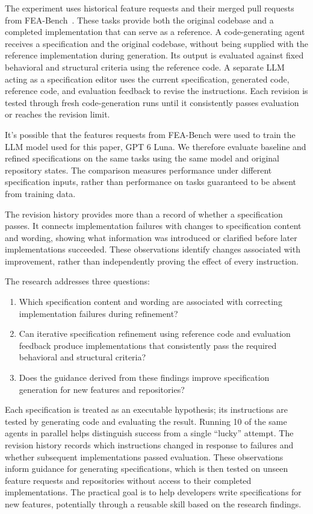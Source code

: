 \documentclass[sigconf,nonacm]{acmart}
\begin{document}
The experiment uses historical feature requests and their merged pull requests from FEA-Bench~\citep{fea2025}. These tasks provide both the original codebase and a completed implementation that can serve as a reference. A code-generating agent receives a specification and the original codebase, without being supplied with the reference implementation during generation. Its output is evaluated against fixed behavioral and structural criteria using the reference code. A separate LLM acting as a specification editor uses the current specification, generated code, reference code, and evaluation feedback to revise the instructions. Each revision is tested through fresh code-generation runs until it consistently passes evaluation or reaches the revision limit.

It's possible that the features requests from FEA-Bench were used to train the LLM model used for this paper, GPT 6 Luna. We therefore evaluate baseline and refined specifications on the same tasks using the same model and original repository states. The comparison measures performance under different specification inputs, rather than performance on tasks guaranteed to be absent from training data.

The revision history provides more than a record of whether a specification passes. It connects implementation failures with changes to specification content and wording, showing what information was introduced or clarified before later implementations succeeded. These observations identify changes associated with improvement, rather than independently proving the effect of every instruction.

The research addresses three questions:

\begin{enumerate}
  \item Which specification content and wording are associated with correcting implementation failures during refinement?
  \item Can iterative specification refinement using reference code and evaluation feedback produce implementations that consistently pass the required behavioral and structural criteria?
  \item Does the guidance derived from these findings improve specification generation for new features and repositories?
\end{enumerate}

Each specification is treated as an executable hypothesis; its instructions are tested by generating code and evaluating the result. Running 10 of the same agents in parallel helps distinguish success from a single ``lucky'' attempt. The revision history records which instructions changed in response to failures and whether subsequent implementations passed evaluation. These observations inform guidance for generating specifications, which is then tested on unseen feature requests and repositories without access to their completed implementations. The practical goal is to help developers write specifications for new features, potentially through a reusable skill based on the research findings.
\end{document}
